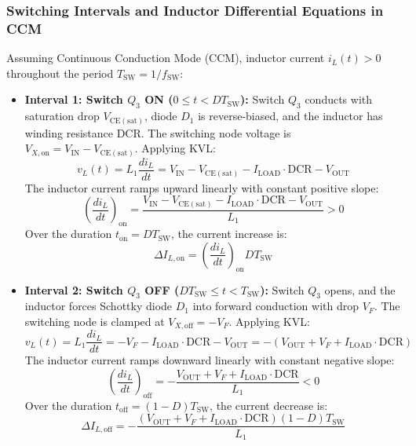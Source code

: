 \documentclass[11pt,a4paper]{article}
\begin{document}
\subsubsection{Switching Intervals and Inductor Differential Equations in CCM}
Assuming Continuous Conduction Mode (CCM), inductor current $i_L(t) > 0$ throughout the period $T_{\mathrm{SW}} = 1/f_{\mathrm{SW}}$:
\begin{itemize}
    \item \textbf{Interval 1: Switch $Q_3$ ON ($0 \le t < DT_{\mathrm{SW}}$):} Switch $Q_3$ conducts with saturation drop $V_{\mathrm{CE(sat)}}$, diode $D_1$ is reverse-biased, and the inductor has winding resistance $\mathrm{DCR}$. The switching node voltage is $V_{X,\mathrm{on}} = V_{\mathrm{IN}} - V_{\mathrm{CE(sat)}}$. Applying KVL:
    \begin{equation}
        v_L(t) = L_1 \frac{di_L}{dt} = V_{\mathrm{IN}} - V_{\mathrm{CE(sat)}} - I_{\mathrm{LOAD}}\cdot \mathrm{DCR} - V_{\mathrm{OUT}}
    \end{equation}
    The inductor current ramps upward linearly with constant positive slope:
    \begin{equation}
        \left(\frac{di_L}{dt}\right)_{\mathrm{on}} = \frac{V_{\mathrm{IN}} - V_{\mathrm{CE(sat)}} - I_{\mathrm{LOAD}}\cdot \mathrm{DCR} - V_{\mathrm{OUT}}}{L_1} > 0
    \end{equation}
    Over the duration $t_{\mathrm{on}} = D T_{\mathrm{SW}}$, the current increase is:
    \begin{equation}
        \Delta I_{L,\mathrm{on}} = \left(\frac{di_L}{dt}\right)_{\mathrm{on}} D T_{\mathrm{SW}}
    \end{equation}
    \item \textbf{Interval 2: Switch $Q_3$ OFF ($DT_{\mathrm{SW}} \le t < T_{\mathrm{SW}}$):} Switch $Q_3$ opens, and the inductor forces Schottky diode $D_1$ into forward conduction with drop $V_F$. The switching node is clamped at $V_{X,\mathrm{off}} = -V_F$. Applying KVL:
    \begin{equation}
        v_L(t) = L_1 \frac{di_L}{dt} = -V_F - I_{\mathrm{LOAD}}\cdot \mathrm{DCR} - V_{\mathrm{OUT}} = -(V_{\mathrm{OUT}} + V_F + I_{\mathrm{LOAD}}\cdot \mathrm{DCR})
    \end{equation}
    The inductor current ramps downward linearly with constant negative slope:
    \begin{equation}
        \left(\frac{di_L}{dt}\right)_{\mathrm{off}} = -\frac{V_{\mathrm{OUT}} + V_F + I_{\mathrm{LOAD}}\cdot \mathrm{DCR}}{L_1} < 0
    \end{equation}
    Over the duration $t_{\mathrm{off}} = (1 - D)T_{\mathrm{SW}}$, the current decrease is:
    \begin{equation}
        \Delta I_{L,\mathrm{off}} = -\frac{(V_{\mathrm{OUT}} + V_F + I_{\mathrm{LOAD}}\cdot \mathrm{DCR})(1 - D)T_{\mathrm{SW}}}{L_1}
    \end{equation}
\end{itemize}
\end{document}
